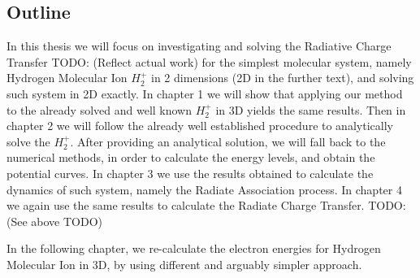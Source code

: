 \subsection*{Outline}

In this thesis we will focus on investigating and solving the Radiative Charge Transfer TODO: (Reflect actual work) for the simplest molecular system, namely Hydrogen Molecular Ion $ {H_2^{+}}  $ in 2 dimensions (2D in the further text), and solving such system in 2D exactly.  In chapter 1 we will show that applying our method to the already solved and well known $ {H_2^{+}} $ in 3D yields the same results. Then in chapter 2 we will follow  the already well established procedure \cite{Bates1} to analytically solve the $ {H_2^{+}} $. After providing an analytical solution, we will fall back to the numerical methods, in order to calculate the energy levels, and obtain the potential curves. In chapter 3 we use the results obtained to calculate the dynamics of such system, namely the Radiate Association process. In chapter 4 we again use the same results to calculate the Radiate Charge Transfer. TODO: (See above TODO)

In the following chapter, we re-calculate the electron energies for Hydrogen Molecular Ion in 3D, by using different and arguably simpler approach.

